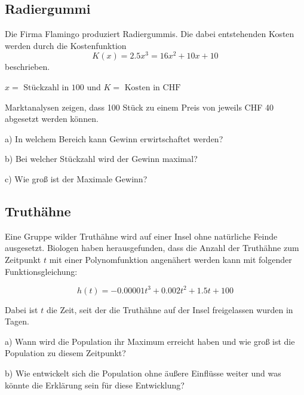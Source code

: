 \subsection{Radiergummi}
Die Firma Flamingo produziert Radiergummis. Die dabei entstehenden
Kosten werden durch die Kostenfunktion
$$K(x) = 2.5x^3 = 16x^2 + 10x + 10$$
beschrieben.

$x = \text{ Stückzahl in 100}$ und $K = \text{ Kosten in CHF}$

Marktanalysen zeigen, dass 100 Stück zu einem Preis von jeweils CHF 40
abgesetzt werden können.

a) In welchem Bereich kann Gewinn erwirtschaftet werden?

b) Bei welcher Stückzahl wird der Gewinn maximal?

c) Wie groß ist der Maximale Gewinn?



\subsection{Truthähne}
Eine Gruppe wilder Truthähne wird auf einer Insel ohne natürliche Feinde ausgesetzt. Biologen haben
herausgefunden, dass die Anzahl der Truthähne zum Zeitpunkt $t$ mit
einer Polynomfunktion angenähert werden kann mit folgender
Funktionsgleichung:

$$h(t) = -0.00001 t^3 + 0.002 t^2 + 1.5t + 100$$

Dabei ist $t$ die Zeit, seit der die Truthähne auf der Insel freigelassen wurden in Tagen.

a)
Wann wird die Population ihr Maximum erreicht haben und wie groß ist die Population zu
diesem Zeitpunkt?

b)
Wie entwickelt sich die Population ohne äußere Einflüsse weiter und was könnte die Erklärung
sein für diese Entwicklung?

